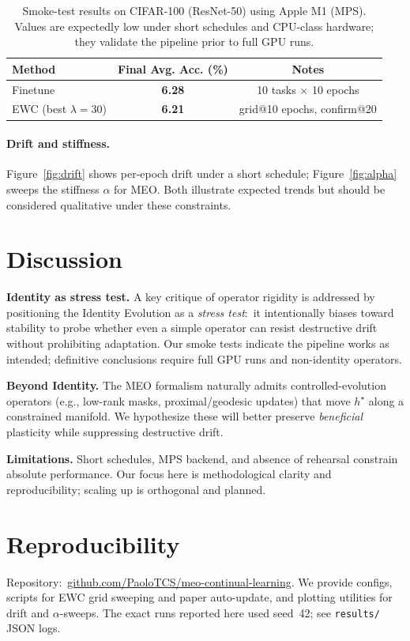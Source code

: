 \documentclass[11pt]{article}
\newcommand{\EWC}{\textsc{EWC}}
\newcommand{\MEO}{\textsc{MEO}}
\begin{document}
\begin{table}[h]
\centering
\begin{tabular}{lcc}
\toprule
Method & Final Avg. Acc. (\%) & Notes \\
\midrule
Finetune & \textbf{6.28} & 10 tasks $\times$ 10 epochs \\
\EWC{} (best $\lambda{=}30$) & \textbf{6.21} & grid@10 epochs, confirm@20 \\
\bottomrule
\end{tabular}
\caption{Smoke-test results on CIFAR-100 (ResNet-50) using Apple M1 (MPS). Values are expectedly low under short schedules and CPU-class hardware; they validate the pipeline prior to full GPU runs.}
\label{tab:main}
\end{table}

\paragraph{Drift and stiffness.}
Figure~\ref{fig:drift} shows per-epoch drift under a short schedule; Figure~\ref{fig:alpha} sweeps the stiffness $\alpha$ for \MEO{}. Both illustrate expected trends but should be considered qualitative under these constraints.

\section{Discussion}
\textbf{Identity as stress test.} A key critique of operator rigidity is addressed by positioning the Identity Evolution as a \emph{stress test}:\ it intentionally biases toward stability to probe whether even a simple operator can resist destructive drift without prohibiting adaptation. Our smoke tests indicate the pipeline works as intended; definitive conclusions require full GPU runs and non-identity operators.

\textbf{Beyond Identity.} The \MEO{} formalism naturally admits controlled-evolution operators (e.g., low-rank masks, proximal/geodesic updates) that move $h^\star$ along a constrained manifold. We hypothesize these will better preserve \emph{beneficial} plasticity while suppressing destructive drift.

\textbf{Limitations.} Short schedules, MPS backend, and absence of rehearsal constrain absolute performance. Our focus here is methodological clarity and reproducibility; scaling up is orthogonal and planned.

\section{Reproducibility}
Repository:\ \href{https://github.com/PaoloTCS/meo-continual-learning}{github.com/PaoloTCS/meo-continual-learning}. We provide configs, scripts for \EWC{} grid sweeping and paper auto-update, and plotting utilities for drift and $\alpha$-sweeps. The exact runs reported here used seed~42; see \texttt{results/} JSON logs.
\end{document}
